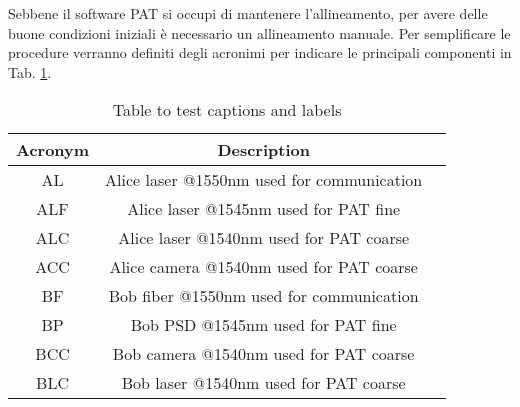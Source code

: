 Sebbene il software PAT si occupi di mantenere l'allineamento, per avere delle buone condizioni iniziali è necessario un allineamento manuale. Per semplificare le procedure verranno definiti degli acronimi per indicare le principali componenti in Tab. \ref{table:1}.

\begin{table}[h!]
  \centering
  \begin{tabular}{ |c|c|c| }
    \hline
    Acronym & Description                                \\
    \hline
    AL      & Alice laser @1550nm used for communication \\
    ALF     & Alice laser @1545nm used for PAT fine      \\
    ALC     & Alice laser @1540nm used for PAT coarse    \\
    ACC     & Alice camera @1540nm used for PAT coarse   \\
    BF      & Bob fiber @1550nm used for communication   \\
    BP      & Bob PSD @1545nm used for PAT fine          \\
    BCC     & Bob camera @1540nm used for PAT coarse     \\
    BLC     & Bob laser @1540nm used for PAT coarse      \\
    \hline
  \end{tabular}
  \caption{Table to test captions and labels}
  \label{table:1}
\end{table}

